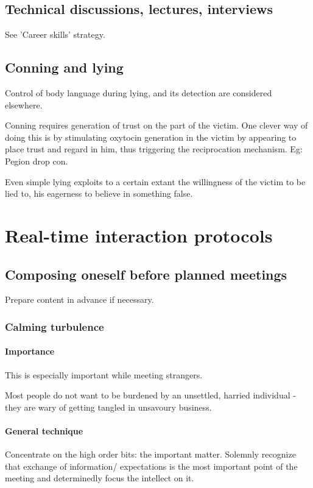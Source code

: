 \documentclass[oneside, article]{memoir}
\begin{document}
\chapter{Technical discussions, lectures, interviews}
See 'Career skills' strategy.

\chapter{Conning and lying}
Control of body language during lying, and its detection are considered elsewhere.

Conning requires generation of trust on the part of the victim. One clever way of doing this is by stimulating oxytocin generation in the victim by appearing to place trust and regard in him, thus triggering the reciprocation mechanism. Eg: Pegion drop con.

Even simple lying exploits to a certain extant the willingness of the victim to be lied to, his eagerness to believe in something false.

\part{Real-time interaction protocols}
\chapter{Composing oneself before planned meetings}
Prepare content in advance if necessary.

\section{Calming turbulence}
\subsection{Importance}
This is especially important while meeting strangers.

Most people do not want to be burdened by an unsettled, harried individual - they are wary of getting tangled in unsavoury business.

\subsection{General technique}
Concentrate on the high order bits: the important matter. Solemnly recognize that exchange of information/ expectations is the most important point of the meeting and determinedly focus the intellect on it.
\end{document}
